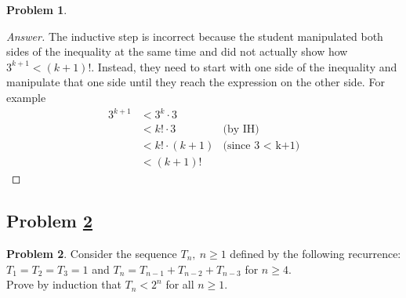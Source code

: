 \documentclass[11pt]{article}
\theoremstyle{definition}
\theoremstyle{definition}
\newtheorem{required}{Problem}
\theoremstyle{definition}
\begin{document}
\begin{required}
\begin{enumerate}[label=(\alph*)]
\begin{proof}[Answer]
The inductive step is incorrect because the student manipulated both sides of the inequality at the same time and did not actually show how $3^{k+1} < (k+1)!$. Instead, they need to start with one side of the inequality and manipulate that one side until they reach the expression on the other side. For example 
\begin {align*}
3^{k+1} &< 3^k\cdot 3 \\
 &< k! \cdot 3      & \text{(by IH)}\\
 &< k! \cdot (k+1)      &\text{(since 3 $<$ k+1)}\\
 &< (k+1)!
\end{align*}

\end{proof}
\end{enumerate}
\end{required}





\newpage
\subsection{Problem \ref{Induction2}} 
\begin{required} \label{Induction2}
Consider the sequence $T_n,~n\geq 1$ defined by the following recurrence: $T_1=T_2=T_3=1$ and $T_n=T_{n-1}+T_{n-2}+T_{n-3}$ for $n\geq 4$. \\

\noindent Prove by induction that $T_{n} < 2^n$ for all $n\geq 1$. 
\end{required}
\end{document}
